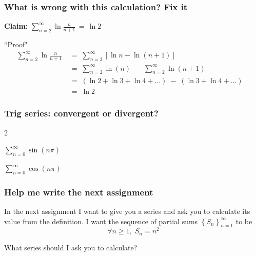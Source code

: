 \documentclass[14pt]{beamer}
\begin{document}
\begin{frame}[t]
	\fontsize{13}{13}\selectfont
	\frametitle{What is wrong with this calculation? Fix it}

	{\bfseries Claim:} \; $\displaystyle \sum_{n=2}^{\infty}\ln \frac{n}{n+1}\, =\,
	\ln 2$

	\begin{block}{``Proof"}
		\vspace{-.4cm}
		\begin{align*}
			\sum_{n=2}^{\infty}\ln \frac{n}{n+1}\; & = \; \sum_{n=2}^{\infty}\left[ \ln{n}- \ln(n+1) \right]                                             \\
			\;                                     & = \; \sum_{n=2}^{\infty}\ln (n) \; - \; \sum_{n=2}^{\infty}\ln (n+1)                                \\
			\;                                     & = \; \left( \ln 2 + \ln 3 + \ln 4 + \ldots \right) \; - \; ( \ln 3 + \ln 4 + \ldots) \phantom{\int} \\
			\;                                     & = \; \ln 2
		\end{align*}
	\end{block}
\end{frame}

\begin{frame}[t]
	\frametitle{Trig series: convergent or divergent?}

	\begin{enumerate}
	\end{enumerate}
\end{frame}

\begin{frame}[t]
	\frametitle{Help me write the next assignment}

	In the next assignment I want to give you a series and ask you to calculate
	its value from the definition. I want the sequence of partial sums $\displaystyle
	\left\{ S_{n}\right\}_{n=1}^{\infty}$ to be
	\[
		\forall n \geq 1, \; S_{n}= n^{2}
	\]

	What series should I ask you to calculate?
\end{frame}
\end{document}
